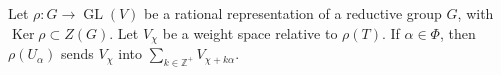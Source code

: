 Let $\rho: G \rightarrow \operatorname{GL}(V)$ be a rational representation of a reductive group $G$, with $\operatorname{Ker} \rho \subset Z(G)$. Let $V_\chi$ be a weight space relative to $\rho(T)$. If $\alpha \in \Phi$, then $\rho(U_\alpha)$ sends $V_\chi$ into $\sum_{k \in \mathbb{Z}^+} V_{\chi+k\alpha}$.
